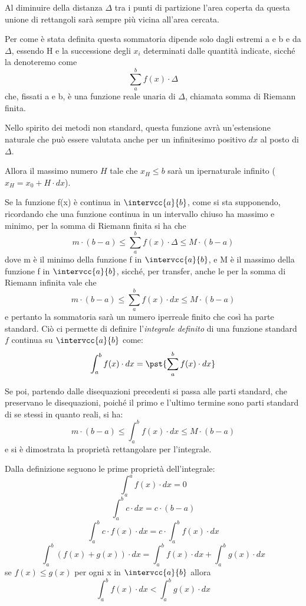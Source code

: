 Al diminuire della distanza \(\Delta\) tra i punti di partizione 
l'area coperta da questa unione di rettangoli sarà sempre più vicina all'area 
cercata.

Per come è stata definita questa sommatoria dipende solo dagli estremi a e b 
e da \(\Delta\), essendo H e la successione degli \(x_i\) determinati dalle 
quantità indicate, sicché la denoteremo come 
\[\sum_a^b f(x) \cdot\Delta\] 
che, fissati a e b, è una 
funzione reale unaria di \(\Delta\), chiamata somma di Riemann finita. 

Nello spirito dei metodi non standard, questa funzione avrà un'estensione 
naturale che può essere valutata anche per un infinitesimo positivo \(dx\) 
al posto di \(\Delta\).

Allora il massimo numero \(H\) tale che \(x_H \le b\) sarà un ipernaturale 
infinito (\(x_H = x_0 + H \cdot dx\)).


 Se la funzione f(x) è continua in \(\intervcc{a}{b}\), come si sta 
supponendo, 
ricordando che una funzione continua in un intervallo chiuso ha massimo e 
minimo, per la somma di Riemann finita si ha che 
\[m\cdot(b - a) \le \sum_a^b f(x) \cdot\Delta \le M\cdot(b - a)\] 
dove m è il minimo della funzione f in \(\intervcc{a}{b}\), e 
M è il massimo della funzione f in \(\intervcc{a}{b}\), sicché, per transfer, 
anche le per 
la somma di Riemann infinita vale che 
\[m \cdot (b - a) \le  \sum_a^b f(x) \cdot dx  \le M\cdot(b - a)\]
e pertanto la sommatoria sarà un numero iperreale finito che così ha parte 
standard. 
Ciò ci permette di definire l'\emph{integrale definito} di una funzione 
standard \(f\) continua su \(\intervcc{a}{b}\) come:
\[\int_a^b f(x) \cdot dx = \pst{\sum_a^b f(x) \cdot dx}\]

Se poi, 
partendo dalle disequazioni precedenti si passa alle parti standard, che 
preservano le disequazioni, poiché il primo e l'ultimo termine sono parti 
standard di se stessi in quanto reali, si ha: 
\[m \cdot(b - a) \le  \int_a^b f(x) \cdot dx  \le M\cdot(b - a)\] 
e si è dimostrata la proprietà rettangolare per l'integrale.

Dalla definizione seguono le prime proprietà dell'integrale:
\[\int_a^a f(x) \cdot dx=0\] 
\[\int_a^b c \cdot dx = c \cdot (b-a)\] 
\[\int_a^b c \cdot f(x) \cdot dx = c\cdot\int_a^b f(x) \cdot dx\] 
\[\int_a^b (f(x)+g(x))\cdot dx = 
  \int_a^b f(x) \cdot dx + \int_a^b g(x)\cdot dx\]
se \(f(x) \le g(x)\) per ogni x in \(\intervcc{a}{b}\) allora 
\[\int_a^b f(x) \cdot dx < \int_a^b g(x)\cdot dx\]

